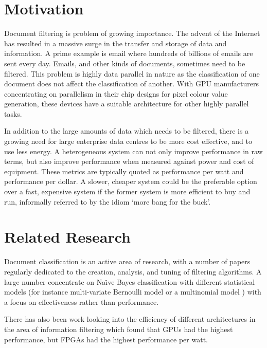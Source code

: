 \section{Motivation}

Document filtering is problem of growing importance. The advent of the Internet
has resulted in a massive surge in the transfer and storage of data and
information. A prime example is email where hundreds of billions of emails are
sent every day. Emails, and other kinds of documents, sometimes need to be
filtered. This problem is highly data parallel in nature as the classification
of one document does not affect the classification of another. With GPU
manufacturers concentrating on parallelism in their chip designs for pixel
colour value generation, these devices have a suitable architecture for other
highly parallel tasks.

In addition to the large amounts of data which needs to be filtered, there is a
growing need for large enterprise data centres to be more cost effective, and to
use less energy. A heterogeneous system can not only improve performance in raw
terms, but also improve performance when measured against power and cost of
equipment. These metrics are typically quoted as performance per watt and
performance per dollar. A slower, cheaper system could be the preferable option
over a fast, expensive system if the former system is more efficient to buy and
run, informally referred to by the idiom `more bang for the buck'.

\section{Related Research}
\label{sec:relatedResearch}

Document classification is an active area of research, with a number of papers
regularly dedicated to the creation, analysis, and tuning of filtering
algorithms. A large number concentrate on Na{\"{\i}}ve Bayes classification
\cite{androutsopoulos2000evaluation} \cite{androutsopoulos2000learning}  with
different statistical models (for instance multi-variate Bernoulli model
\cite{Schneider:2003:CEM:1067807.1067848} or a multinomial model
\cite{mccallum1998comparison}) with a focus on effectiveness rather than
performance.

There has also been work looking into the efficiency of different architectures
in the area of information filtering \cite{chen2012invited}
\cite{he2013massively} which found that GPUs had the highest performance, but
FPGAs had the highest performance per watt.

